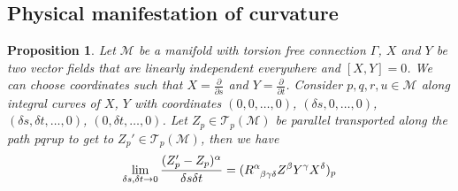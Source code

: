 \documentclass[a4paper]{article}
\theoremstyle{new}
\newtheorem{prop}{Proposition}[section]
\begin{document}
\subsection{Physical manifestation of curvature}
\begin{prop}
Let $\mathcal{M}$ be a manifold with torsion free connection $\Gamma$, $X$ and $Y$ be two vector fields that are linearly independent everywhere and $[X,Y]=0$. We can choose coordinates such that $X=\frac{\partial}{\partial s}$ and $Y=\frac{\partial}{\partial t}$. Consider $p,q,r,u\in\mathcal{M}$ along integral curves of $X$, $Y$ with coordinates $(0,0,\dots ,0)$, $(\delta s,0,\dots ,0)$, $(\delta s,\delta t,\dots ,0)$, $(0,\delta t,\dots ,0)$. Let $Z_p\in\mathcal{T}_p(\mathcal{M})$ be parallel transported along the path pqrup to get to $Z_p'\in\mathcal{T}_p(\mathcal{M})$, then we have
\begin{equation}
\lim_{\delta s,\delta t\rightarrow 0}\frac{(Z_p'-Z_p)^\alpha}{\delta s\delta t}=(\tensor*{R}{*_{}^{\alpha}_{\beta\gamma\delta}}Z^\beta Y^\gamma X^\delta)_p\label{curvature}
\end{equation}
\end{prop}
\end{document}
